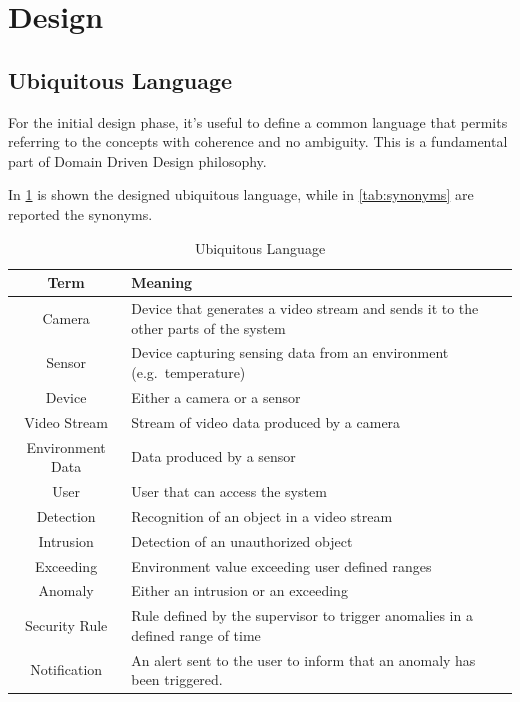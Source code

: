 \documentclass{scrartcl}
\begin{document}
    \section{Design}

    \subsection{Ubiquitous Language}

    For the initial design phase, it's useful to define a common language that permits referring to the concepts with coherence and no ambiguity.
    This is a fundamental part of Domain Driven Design philosophy.

    In \cref{tab:ubiquitous-language} is shown the designed ubiquitous language, while in \cref{tab:synonyms} are reported the synonyms.

    \renewcommand{\arraystretch}{1.5}
    \begin{table}
        \centering
        \begin{tabularx}{0.7\textwidth}{ | c | >{\centering\arraybackslash}X | }
            \hline
            \textbf{Term} & \textbf{Meaning} \\
            \hline
            Camera & Device that generates a video stream and sends it to the other parts of the system \\
            \hline
            Sensor & Device capturing sensing data from an environment (e.g.\ temperature) \\
            \hline
            Device & Either a camera or a sensor \\
            \hline
            Video Stream & Stream of video data produced by a camera \\
            \hline
            Environment Data & Data produced by a sensor \\
            \hline
            User & User that can access the system \\
            \hline
            Detection & Recognition of an object in a video stream \\
            \hline
            Intrusion & Detection of an unauthorized object \\
            \hline
            Exceeding & Environment value exceeding user defined ranges \\
            \hline
            Anomaly & Either an intrusion or an exceeding \\
            \hline
            Security Rule & Rule defined by the supervisor to trigger anomalies in a defined range of time \\
            \hline
            Notification & An alert sent to the user to inform that an anomaly has been triggered. \\
            \hline
        \end{tabularx}
        \caption{Ubiquitous Language}
        \label{tab:ubiquitous-language}
    \end{table}
\end{document}
